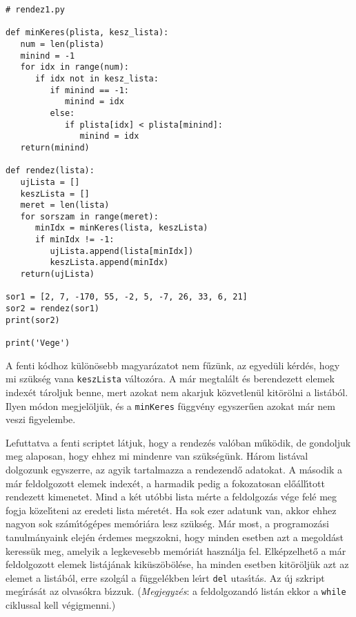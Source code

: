 \documentclass[12pt]{article}
\newcounter{megold}
\begin{document}
\begin{Verbatim}[fontsize=\small]
# rendez1.py

def minKeres(plista, kesz_lista):
   num = len(plista)
   minind = -1
   for idx in range(num):
      if idx not in kesz_lista:
         if minind == -1:
            minind = idx
         else:
            if plista[idx] < plista[minind]:
               minind = idx
   return(minind) 

def rendez(lista):
   ujLista = []
   keszLista = []
   meret = len(lista)
   for sorszam in range(meret):
      minIdx = minKeres(lista, keszLista)
      if minIdx != -1:
         ujLista.append(lista[minIdx])
         keszLista.append(minIdx)
   return(ujLista)

sor1 = [2, 7, -170, 55, -2, 5, -7, 26, 33, 6, 21]
sor2 = rendez(sor1)
print(sor2)

print('Vege')   
\end{Verbatim}

\noindent A fenti k\'odhoz k\"ul\"on\"osebb magyar\'azatot nem f\H{u}z\"unk, az egyed\"uli k\'erd\'es, hogy 
mi sz\"uks\'eg vana {\tt keszLista} v\'altoz\'ora. A m\'ar megtal\'alt \'es berendezett elemek index\'et 
t\'aroljuk benne, mert azokat nem akarjuk k\"ozvetlen\"ul kit\"or\"olni a list\'ab\'ol. Ilyen m\'odon 
megjel\"olj\"uk, \'es a {\tt minKeres} f\"uggv\'eny egyszer\H{u}en azokat m\'ar nem veszi figyelembe.

Lefuttatva a fenti scriptet l\'atjuk, hogy a rendez\'es val\'oban m\H{u}k\"odik, de gondoljuk meg alaposan, 
hogy ehhez mi mindenre van sz\"uks\'eg\"unk. H\'arom list\'aval dolgozunk egyszerre, az agyik tartalmazza a 
rendezend\H{o} adatokat. A m\'asodik a m\'ar feldolgozott elemek index\'et, a harmadik pedig a fokozatosan 
el\H{o}\'all\'{\i}tott rendezett kimenetet. Mind a k\'et ut\'obbi lista m\'erte a feldolgoz\'as v\'ege fel\'e 
meg fogja k\"ozel\'{\i}teni az eredeti lista m\'eret\'et. Ha sok ezer adatunk van, akkor ehhez nagyon sok 
sz\'am\'{\i}t\'og\'epes mem\'ori\'ara lesz sz\"uks\'eg. M\'ar most, a programoz\'asi tanulm\'anyaink elej\'en 
\'erdemes megszokni, hogy minden esetben azt a megold\'ast keress\"uk meg, amelyik a legkevesebb mem\'ori\'at 
haszn\'alja fel. Elk\'epzelhet\H{o} a m\'ar feldolgozott elemek list\'aj\'anak kik\"usz\"ob\"ol\'ese, ha minden 
esetben kit\"or\"olj\"uk azt az elemet a list\'ab\'ol, erre szolg\'al a f\"uggel\'ekben le\'{\i}rt {\tt del} 
utas\'{\i}t\'as. Az \'uj szkript meg\'{\i}r\'as\'at az olvas\'okra b\'{\i}zzuk. ({\it Megjegyz\'es}: a feldolgozand\'o 
list\'an ekkor a {\tt while} ciklussal kell v\'egigmenni.)
\end{document}
